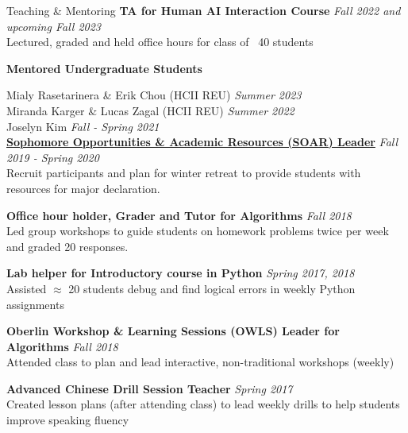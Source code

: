 \documentclass{resume}
\begin{document}
\begin{rSection}{Teaching \& Mentoring}
{\bf TA for Human AI Interaction Course} \hfill  {\em Fall 2022 and upcoming Fall 2023} \\
{Lectured, graded and held office hours for class of ~40 students}
\begin{center}
{\bf Mentored Undergraduate Students}     
\end{center}
{Mialy Rasetarinera \& Erik Chou (HCII REU)} \hfill  {\em Summer 2023} \\
{Miranda Karger \& Lucas Zagal (HCII REU)} \hfill  {\em Summer 2022} \\
{Joselyn Kim} \hfill  {\em Fall - Spring 2021} \\

{\bf \href{https://www.oberlin.edu/career/set/soar/soar-leaders}{Sophomore Opportunities \& Academic Resources (SOAR) Leader}} \hfill{\em Fall 2019 - Spring 2020} \\
Recruit participants and plan for winter retreat to provide students with resources for major declaration.

{\bf Office hour holder, Grader and Tutor for Algorithms} \hfill {\em Fall 2018} \\
{ Led group workshops to guide students on homework problems twice per week and graded 20 responses.} 

{\bf Lab helper for Introductory course in Python} \hfill {\em Spring 2017, 2018} \\
{ Assisted $\approx$ 20 students debug and find logical errors in weekly Python assignments}

{\bf Oberlin Workshop \& Learning Sessions (OWLS) Leader for Algorithms} \hfill {\em Fall 2018} \\
{ Attended class to plan and lead interactive, non-traditional workshops (weekly)} 

{\bf Advanced Chinese Drill Session Teacher} \hfill {\em Spring 2017} \\
{ Created lesson plans (after attending class) to lead weekly drills to help students improve speaking fluency}

\end{rSection}
\end{document}
